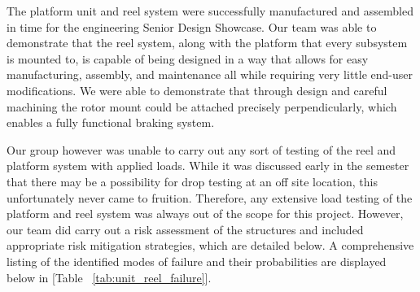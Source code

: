 \indent\indent The platform unit and reel system were successfully manufactured and assembled in time for the engineering Senior Design Showcase. Our team was able to demonstrate that the reel system, along with the platform that every subsystem is mounted to, is capable of being designed in a way that allows for easy manufacturing, assembly, and maintenance all while requiring very little end-user modifications. We were able to demonstrate that through design and careful machining the rotor mount could be attached precisely perpendicularly, which enables a fully functional braking system. 

Our group however was unable to carry out any sort of testing of the reel and platform system with applied loads. While it was discussed early in the semester that there may be a possibility for drop testing at an off site location, this unfortunately never came to fruition. Therefore, any extensive load testing of the platform and reel system was always out of the scope for this project. However, our team did carry out a risk assessment of the structures and included appropriate risk mitigation strategies, which are detailed below. A comprehensive listing of the identified modes of failure and their probabilities are displayed below in [Table ~\ref{tab:unit_reel_failure}]. 

\begin{table}[H]
\caption{\label{tab:unit_reel_failure} Unit \& Reel System Failure Modes \& Probabilities}
\centering

\end{table}

